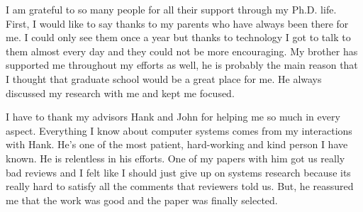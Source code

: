 I am grateful to so many people for all their support through my Ph.D. life. First,
I would like to say thanks to my parents who have always been there for me. I could
only see them once a year but thanks to technology I got to talk to them almost every day
and they could not be more encouraging. My brother has supported me throughout
my efforts as well, he is probably the main reason that I thought that graduate
school would be a great place for me. He always discussed my research with me and
kept me focused.

I have to thank my advisors Hank and John for helping me so much in every aspect.
Everything I know about computer systems comes from my interactions with Hank.
He's one of the most patient, hard-working and kind person I have known. He is
relentless in his efforts. One of my papers with him got us really bad reviews and I felt like I should just give up on systems research because its really hard to satisfy all the comments that reviewers told us. But, he reassured me that the work was good and 
the paper was finally selected. 
